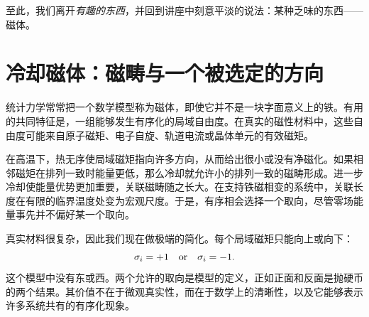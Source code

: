 \begin{classroomqa}
\end{classroomqa}

至此，我们离开\emph{有趣的东西}，并回到讲座中刻意平淡的说法：某种乏味的东西——磁体。

\section{冷却磁体：磁畴与一个被选定的方向}

统计力学常常把一个数学模型称为磁体，即使它并不是一块字面意义上的铁。有用的共同特征是，一组能够发生有序化的局域自由度。在真实的磁性材料中，这些自由度可能来自原子磁矩、电子自旋、轨道电流或晶体单元的有效磁矩。

在高温下，热无序使局域磁矩指向许多方向，从而给出很小或没有净磁化。如果相邻磁矩在排列一致时能量更低，那么冷却就允许小的排列一致的磁畴形成。进一步冷却使能量优势更加重要，关联磁畴随之长大。在支持铁磁相变的系统中，关联长度在有限的临界温度处变为宏观尺度。于是，有序相会选择一个取向，尽管零场能量事先并不偏好某一个取向。

\begin{classroomqa}
\end{classroomqa}

\begin{classroomqa}
\end{classroomqa}

真实材料很复杂，因此我们现在做极端的简化。每个局域磁矩只能向上或向下：
\begin{equation}
 \sigma_i=+1\quad\hbox{or}\quad\sigma_i=-1.
 \label{eq:sm8-ising-spin}
\end{equation}
这个模型中没有东或西。两个允许的取向是模型的定义，正如正面和反面是抛硬币的两个结果。其价值不在于微观真实性，而在于数学上的清晰性，以及它能够表示许多系统共有的有序化现象。

